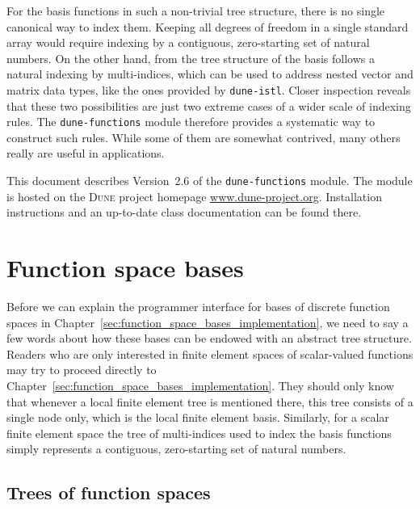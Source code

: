 \documentclass[a4paper,10pt,headings=normal,bibliography=totoc]{scrartcl}
\newcommand{\dune}{\textsc{Dune}\xspace}
\newcommand{\dunemodule}[1]{\texttt{#1}}
\begin{document}
For the basis functions in such a non-trivial tree structure, there is no single canonical way
to index them.  Keeping all degrees of freedom in a single standard array would require indexing
by a contiguous, zero-starting set of natural numbers. On the other hand, from the tree structure
of the basis follows a natural indexing by multi-indices, which can be used to address nested
vector and matrix data types, like the ones provided by \dunemodule{dune-istl}. Closer inspection
reveals that these two possibilities are just two extreme cases of a wider scale of indexing rules.
The \dunemodule{dune-functions} module therefore provides a systematic way to construct such
rules.  While some of them are somewhat contrived, many others really are useful
in applications.

This document describes Version~2.6 of the \dunemodule{dune-functions} module.
The module is hosted on the \dune project homepage \url{www.dune-project.org}.
Installation instructions and an up-to-date class documentation can be found there.


\newpage

\setcounter{tocdepth}{2}  %
\tableofcontents



\section{Function space bases}
\label{sec:finite_element_trees}


Before we can explain the programmer interface for bases of discrete function spaces in Chapter~\ref{sec:function_space_bases_implementation},
we need to say a few words about how these bases can be endowed with an abstract tree structure.
Readers who are only interested in finite element spaces of scalar-valued functions may try to proceed directly to
Chapter~\ref{sec:function_space_bases_implementation}.  They should only know that whenever a
local finite element tree
is mentioned there, this tree consists of a single node only, which is the local finite element basis.
Similarly, for a scalar finite element space the tree of multi-indices used to index the
basis functions simply represents a contiguous, zero-starting set of natural numbers.

\subsection{Trees of function spaces}
\end{document}
